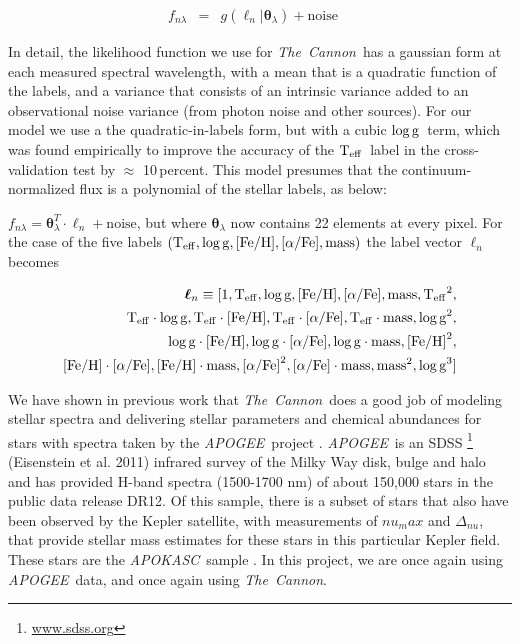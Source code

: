 \documentclass[12pt, preprint]{aastex}
\newcommand{\project}[1]{\textsl{#1}}
\newcommand{\tc}{\project{The~Cannon}}
\newcommand{\apogee}{\project{APOGEE}}
\newcommand{\apokasc}{\project{APOKASC}}
\newcommand{\teff}{\mbox{$\rm T_{eff}$}}
\newcommand{\feh}{\mbox{$\rm [Fe/H]$}}
\newcommand{\alphafe}{\mbox{$\rm [\alpha/Fe]$}}
\newcommand{\logg}{\mbox{$\rm \log g$}}
\newcommand{\set}[1]{\bm{#1}}
\newcommand{\starlabel}{\ell}
\newcommand{\starlabelvec}{\set{\starlabel}}
\begin{document}
\begin{eqnarray}
f_{n\lambda} &=&
g(\starlabelvec_n |  \set{\theta}_\lambda) + \mbox{noise}
\label{eq:specmodel}\quad 
\end{eqnarray}

In detail, the likelihood function we use for \tc\ has a
gaussian form at each measured spectral wavelength, with a mean that
is a quadratic function of the labels, and a variance that consists of
an intrinsic variance added to an observational noise variance (from
photon noise and other sources). For our model we use a the quadratic-in-labels form, but with a cubic \logg\ term, which was found empirically to improve the accuracy of the \teff\ label in the cross-validation test by $\approx$ 10\,percent.  This model presumes that the continuum-normalized flux is a polynomial of the stellar labels, as below: 

$f_{n\lambda} =
\set{\theta}_\lambda^T \cdot \starlabelvec_n + \mbox{noise}$, 
but where $\set{\theta}_\lambda$ now contains 22 elements at every pixel. For the case of the five labels $(\teff , \logg , \feh, \alphafe, \mbox{mass})$ the label vector $\starlabelvec_n$
becomes  

\begin{equation}
\begin{split}
\starlabelvec_n \equiv  [1, \teff, \logg, \feh, \alphafe, \mbox{mass}, \teff^2, \\
 \teff\cdot\logg, \teff\cdot\feh, \teff\cdot\alphafe, \teff\cdot \mbox{mass},  \logg^2, \\
  \logg\cdot\feh, \logg\cdot\alphafe, \logg\cdot \mbox{mass}, \feh^2, \\
  \feh\cdot\alphafe, \feh\cdot \mbox{mass}, \alphafe^2, \alphafe\cdot \mbox{mass}, \mbox{mass}^2,  \logg^3]
\end{split}
 \label{eq:quad}
\end{equation}



We have shown in previous work \citep{Ness2015} that \tc\ does a good job
of modeling stellar spectra and delivering stellar parameters and
chemical abundances for stars with spectra taken by the \apogee\ project \citep{Majewski2012}.  \apogee\ is an SDSS \footnote{\url{www.sdss.org}} (Eisenstein et al. 2011) infrared survey of the Milky Way disk, bulge and halo and has provided H-band spectra (1500-1700 nm) of about 150,000 stars in the public data release DR12.  Of this sample, there is a subset of stars that also have been observed by the Kepler satellite, with measurements of ${nu}_max$ and $\Delta_{nu}$, that provide stellar mass estimates for these stars in this particular Kepler field. These stars are the \apokasc\ sample \citep{P2014}. In this project, we are once again using \apogee\ data, and once again
using \tc. 
\end{document}
